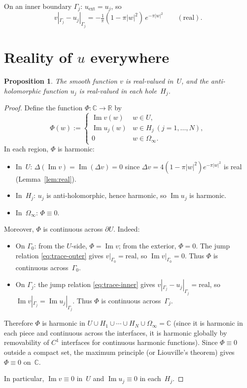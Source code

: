 \documentclass[11pt]{article}
\newtheorem{proposition}[theorem]{Proposition}
\newcommand{\C}{\mathbb C}
\newcommand{\R}{\mathbb R}
\newcommand{\1}{\mathbf 1}
\begin{document}
On an inner boundary \(\Gamma_j\): \(u_{\mathrm{ext}}=u_j\), so
\begin{equation}\label{eq:trace-inner}
v|_{\Gamma_j}-u_j|_{\Gamma_j}
=
-\tfrac1\pi(1-\pi|w|^2)\,e^{-\pi|w|^2}
\qquad(\text{real}).
\end{equation}

\section{Reality of \(u\) everywhere}

\begin{proposition}\label{prop:real}
The smooth function \(v\) is real-valued in~\(U\), and the anti-holomorphic function
\(u_j\) is real-valued in each hole~\(H_j\).
\end{proposition}

\begin{proof}
Define the function \(\Phi:\C\to\R\) by
\[
\Phi(w):=
\begin{cases}
\operatorname{Im}v(w) & w\in U,\\
\operatorname{Im}u_j(w) & w\in H_j\ (j=1,\dots,N),\\
0 & w\in\Omega_\infty.
\end{cases}
\]
In each region, \(\Phi\) is harmonic:
\begin{itemize}
\item In~\(U\): \(\Delta(\operatorname{Im}v)=\operatorname{Im}(\Delta v)=0\) since
\(\Delta v=4(1-\pi|w|^2)e^{-\pi|w|^2}\) is real (Lemma~\ref{lem:real}).
\item In~\(H_j\): \(u_j\) is anti-holomorphic, hence harmonic, so
\(\operatorname{Im}u_j\) is harmonic.
\item In~\(\Omega_\infty\): \(\Phi\equiv 0\).
\end{itemize}

Moreover, \(\Phi\) is continuous across \(\partial U\). Indeed:
\begin{itemize}
\item On \(\Gamma_0\): from the \(U\)-side, \(\Phi=\operatorname{Im}v\); from the
exterior, \(\Phi=0\). The jump relation \eqref{eq:trace-outer} gives
\(v|_{\Gamma_0}=\text{real}\), so \(\operatorname{Im}v|_{\Gamma_0}=0\). Thus \(\Phi\)
is continuous across~\(\Gamma_0\).
\item On \(\Gamma_j\): the jump relation \eqref{eq:trace-inner} gives
\(v|_{\Gamma_j}-u_j|_{\Gamma_j}=\text{real}\), so
\(\operatorname{Im}v|_{\Gamma_j}=\operatorname{Im}u_j|_{\Gamma_j}\). Thus \(\Phi\)
is continuous across~\(\Gamma_j\).
\end{itemize}

Therefore \(\Phi\) is harmonic in
\(U\cup H_1\cup\cdots\cup H_N\cup\Omega_\infty=\C\) (since it is harmonic in each
piece and continuous across the interfaces, it is harmonic globally by removability of
\(C^1\) interfaces for continuous harmonic functions). Since \(\Phi\equiv 0\) outside a
compact set, the maximum principle (or Liouville's theorem) gives
\(\Phi\equiv 0\) on~\(\C\).

In particular, \(\operatorname{Im}v\equiv 0\) in~\(U\) and
\(\operatorname{Im}u_j\equiv 0\) in each~\(H_j\).
\end{proof}
\end{document}
